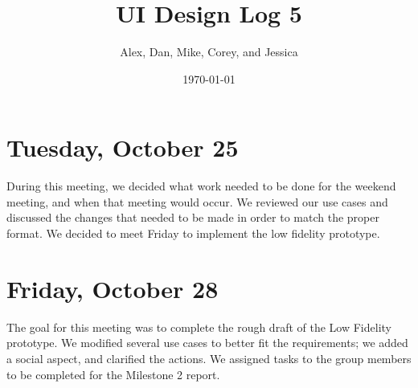 \documentclass{article}
\title{UI Design Log 5}
\author{Alex, Dan, Mike, Corey, and Jessica}
\date{\today}
\begin{document}
\maketitle
\section{Tuesday, October 25}
During this meeting, we decided what work needed to be done for the weekend
meeting, and when that meeting would occur. We reviewed our use cases and
discussed the changes that needed to be made in order to match the proper
format. We decided to meet Friday to implement the low fidelity prototype.

\section{Friday, October 28}
The goal for this meeting was to complete the rough draft of the Low Fidelity
prototype. We modified several use cases to better fit the requirements; we
added a social aspect, and clarified the actions. We assigned tasks to the group
members to be completed for the Milestone 2 report.
\end{document}
